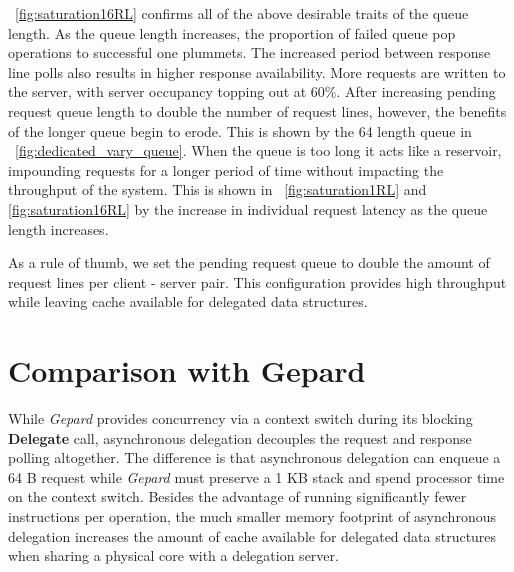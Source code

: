 \documentclass{uicthesi}
\begin{document}
~\ref{fig:saturation16RL} confirms all of the above desirable traits of the queue length. As the queue length increases, the proportion of failed queue pop operations to successful one plummets. The increased period between response line polls also results in higher response availability. More requests are written to the server, with server occupancy topping out at 60\%. After increasing pending request queue length to double the number of request lines, however, the benefits of the longer queue begin to erode. This is shown by the 64 length queue in ~\ref{fig:dedicated_vary_queue}. When the queue is too long it acts like a reservoir, impounding requests for a longer period of time without impacting the throughput of the system. This is shown in ~\ref{fig:saturation1RL} and \ref{fig:saturation16RL} by the increase in individual request latency as the queue length increases. 

As a rule of thumb, we set the pending request queue to double the amount of request lines per client - server pair. This configuration provides high throughput while leaving cache available for delegated data structures. 

\section{Comparison with Gepard}
While \textit{Gepard} provides concurrency via a context switch during its blocking \textbf{Delegate} call, asynchronous delegation decouples the request and response polling altogether. The difference is that asynchronous delegation can enqueue a 64 B  request while \textit{Gepard} must preserve a 1 KB stack and spend processor time on the context switch. Besides the advantage of running significantly fewer instructions per operation, the much smaller memory footprint of asynchronous delegation increases the amount of cache available for delegated data structures when sharing a physical core with a delegation server.  %
\end{document}
